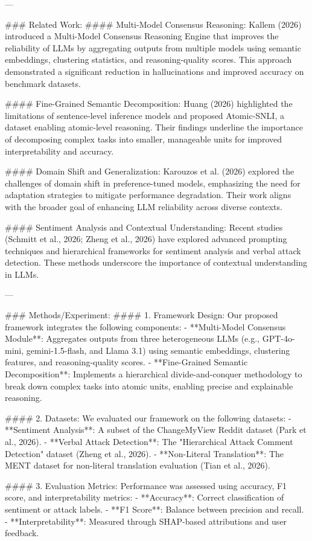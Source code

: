 ---

### Related Work:
#### Multi-Model Consensus Reasoning:
Kallem (2026) introduced a Multi-Model Consensus Reasoning Engine that improves the reliability of LLMs by aggregating outputs from multiple models using semantic embeddings, clustering statistics, and reasoning-quality scores. This approach demonstrated a significant reduction in hallucinations and improved accuracy on benchmark datasets.

#### Fine-Grained Semantic Decomposition:
Huang (2026) highlighted the limitations of sentence-level inference models and proposed Atomic-SNLI, a dataset enabling atomic-level reasoning. Their findings underline the importance of decomposing complex tasks into smaller, manageable units for improved interpretability and accuracy.

#### Domain Shift and Generalization:
Karouzos et al. (2026) explored the challenges of domain shift in preference-tuned models, emphasizing the need for adaptation strategies to mitigate performance degradation. Their work aligns with the broader goal of enhancing LLM reliability across diverse contexts.

#### Sentiment Analysis and Contextual Understanding:
Recent studies (Schmitt et al., 2026; Zheng et al., 2026) have explored advanced prompting techniques and hierarchical frameworks for sentiment analysis and verbal attack detection. These methods underscore the importance of contextual understanding in LLMs.

---

### Methods/Experiment:
#### 1. Framework Design:
Our proposed framework integrates the following components:
- **Multi-Model Consensus Module**: Aggregates outputs from three heterogeneous LLMs (e.g., GPT-4o-mini, gemini-1.5-flash, and Llama 3.1) using semantic embeddings, clustering features, and reasoning-quality scores.
- **Fine-Grained Semantic Decomposition**: Implements a hierarchical divide-and-conquer methodology to break down complex tasks into atomic units, enabling precise and explainable reasoning.

#### 2. Datasets:
We evaluated our framework on the following datasets:
- **Sentiment Analysis**: A subset of the ChangeMyView Reddit dataset (Park et al., 2026).
- **Verbal Attack Detection**: The "Hierarchical Attack Comment Detection" dataset (Zheng et al., 2026).
- **Non-Literal Translation**: The MENT dataset for non-literal translation evaluation (Tian et al., 2026).

#### 3. Evaluation Metrics:
Performance was assessed using accuracy, F1 score, and interpretability metrics:
- **Accuracy**: Correct classification of sentiment or attack labels.
- **F1 Score**: Balance between precision and recall.
- **Interpretability**: Measured through SHAP-based attributions and user feedback.

